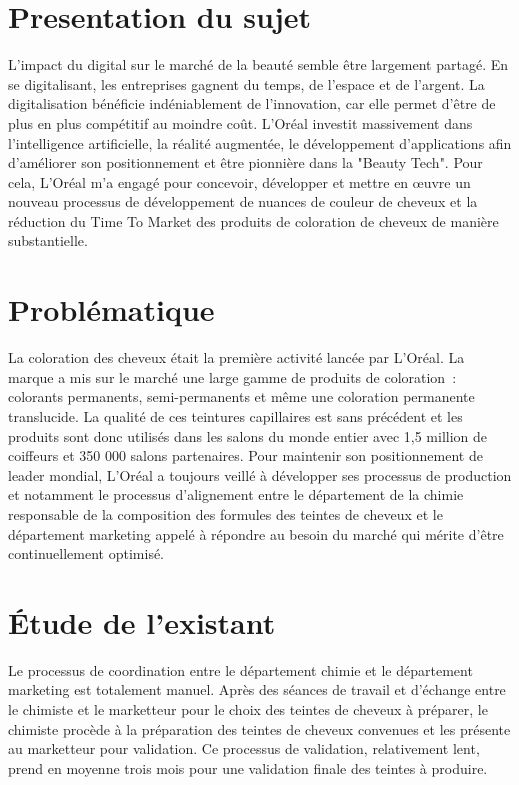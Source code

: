 \section{Presentation du sujet}
L’impact du digital sur le marché de la beauté semble être largement partagé. En se digitalisant, les entreprises gagnent du temps, de l’espace et de l’argent. La digitalisation bénéficie indéniablement de l’innovation, car elle permet d’être de plus en plus compétitif au moindre coût. 
L’Oréal investit massivement dans l’intelligence artificielle, la réalité augmentée, le développement d’applications afin d’améliorer son positionnement et être pionnière dans la "Beauty Tech".
Pour cela, L’Oréal m’a engagé pour concevoir, développer et mettre en œuvre un nouveau processus de développement de nuances de couleur de cheveux et la réduction du Time To Market des produits de coloration de cheveux de manière substantielle.

\newpage
\section{Problématique}
La coloration des cheveux était la première activité lancée par L’Oréal. La marque a mis sur le marché une large gamme de produits de coloration : colorants permanents, semi-permanents et même une coloration permanente translucide. La qualité de ces teintures capillaires est sans précédent et les produits sont donc utilisés dans les salons du monde entier avec 1,5 million de coiffeurs et 350 000 salons partenaires.
Pour maintenir son positionnement de leader mondial, L’Oréal a toujours veillé à développer ses processus de production et notamment le processus d’alignement entre le département de la chimie responsable de la composition des formules des teintes de cheveux et le département marketing appelé à répondre au besoin du marché qui mérite d’être continuellement optimisé.

\section{Étude de l’existant}
Le processus de coordination entre le département chimie et le département marketing est totalement manuel. 
Après des séances de travail et d’échange entre le chimiste et le marketteur pour le choix des teintes de cheveux à préparer, le chimiste procède à la préparation des teintes de cheveux convenues et les présente au marketteur pour validation.
Ce processus de validation, relativement lent, prend en moyenne trois mois pour une validation finale des teintes à produire. 

